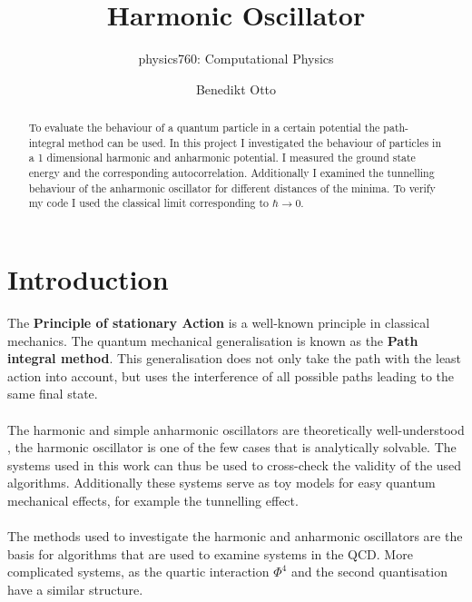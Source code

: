 \documentclass{scrartcl}
\title{Harmonic Oscillator}
\author{Benedikt Otto}
\subtitle{physics760: Computational Physics}
\begin{document}
	\maketitle

	\newpage

	\tableofcontents

	\newpage

	\begin{abstract}
		To evaluate the behaviour of a quantum particle in a certain potential the path-integral method can be used.
		In this project I investigated the behaviour of particles in a 1 dimensional harmonic and anharmonic potential.
		I measured the ground state energy and the corresponding autocorrelation.
		Additionally I examined the tunnelling behaviour of the anharmonic oscillator for different distances of the minima.
		To verify my code I used the classical limit corresponding to $\hbar \rightarrow 0$.
	\end{abstract}

	\section{Introduction}
		The \textbf{Principle of stationary Action} is a well-known principle in classical mechanics.
		The quantum mechanical generalisation is known as the \textbf{Path integral method}.
		This generalisation does not only take the path with the least action into account, but uses the interference of all possible paths leading to the same final state.
		\\\\
		The harmonic and simple anharmonic oscillators are theoretically well-understood \cite{bender}, the harmonic oscillator is one of the few cases that is analytically solvable.
		The systems used in this work can thus be used to cross-check the validity of the used algorithms.
		Additionally these systems serve as toy models for easy quantum mechanical effects, for example the tunnelling effect.
		\\\\
		The methods used to investigate the harmonic and anharmonic oscillators are the basis for algorithms that are used to examine systems in the QCD.
		More complicated systems, as the quartic interaction $\Phi^4$ and the second quantisation have a similar structure.
\end{document}
